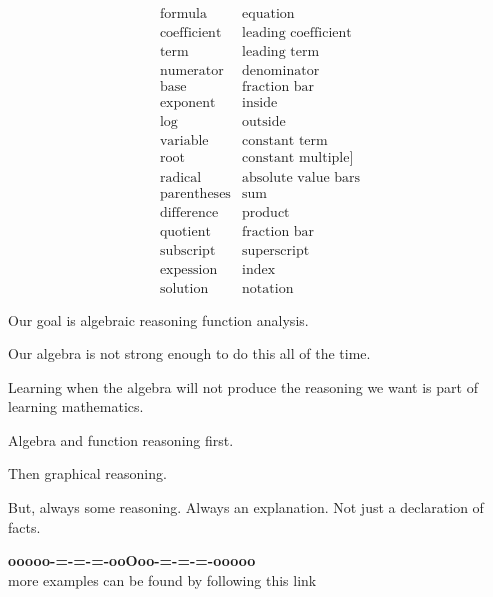 \documentclass{ximera}
\begin{document}
\[
\begin{array}{ll}
\text{formula}  & \text{equation}  \\
\text{coefficient}  & \text{leading coefficient} \\
\text{term}    &  \text{leading term} \\
\text{numerator}  & \text{denominator} \\
\text{base}   & \text{fraction bar} \\
\text{exponent} & \text{inside} \\
\text{log} & \text{outside} \\
\text{variable} & \text{constant term} \\
\text{root} &  \text{constant multiple]} \\ 
\text{radical} &  \text{absolute value bars} \\
\text{parentheses} &  \text{sum}  \\
\text{difference} &  \text{product}  \\
\text{quotient} &  \text{fraction bar} \\
\text{subscript} &  \text{superscript} \\
\text{expession} &  \text{index} \\
\text{solution} &  \text{notation} 
\end{array}
\]



Our goal is algebraic reasoning function analysis.

Our algebra is not strong enough to do this all of the time.





Learning when the algebra will not produce the reasoning we want is part of learning mathematics.  

Algebra and function reasoning first. 

Then graphical reasoning.  


But, always some reasoning.  Always an explanation. Not just a declaration of facts.

















\begin{onlineOnly}
\begin{center}
\textbf{\textcolor{green!50!black}{ooooo-=-=-=-ooOoo-=-=-=-ooooo}} \\

more examples can be found by following this link\\ 

\end{center}
\end{onlineOnly}
\end{document}
